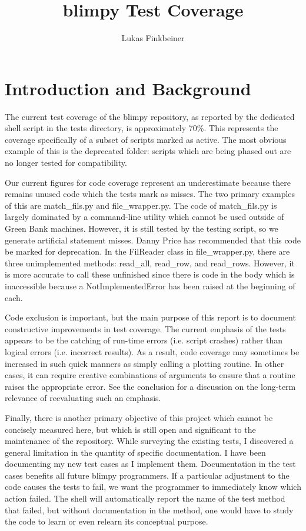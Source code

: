 \documentclass[12pt]{article}
\title{blimpy Test Coverage}
\author{Lukas Finkbeiner}
\begin{document}
\maketitle

\section{Introduction and Background}

\quad \quad The current test coverage of the blimpy repository, as reported by the dedicated shell script in the tests directory, is approximately 70\%. This represents the coverage specifically of a subset of scripts marked as active. The most obvious example of this is the deprecated folder: scripts which are being phased out are no longer tested for compatibility. 

Our current figures for code coverage represent an underestimate because there remains unused code which the tests mark as misses. The two primary examples of this are match\_fils.py and file\_wrapper.py. The code of match\_fils.py is largely dominated by a command-line utility which cannot be used outside of Green Bank machines. However, it is still tested by the testing script, so we generate artificial statement misses. Danny Price has recommended that this code be marked for deprecation. In the FilReader class in file\_wrapper.py, there are three unimplemented methods: read\_all, read\_row, and read\_rows. However, it is more accurate to call these unfinished since there is code in the body which is inaccessible because a NotImplementedError has been raised at the beginning of each.

Code exclusion is important, but the main purpose of this report is to document constructive improvements in test coverage. The current emphasis of the tests appears to be the catching of run-time errors (i.e. script crashes) rather than logical errors (i.e. incorrect results). As a result, code coverage may sometimes be increased in such quick manners as simply calling a plotting routine. In other cases, it can require creative combinations of arguments to ensure that a routine raises the appropriate error. See the conclusion for a discussion on the long-term relevance of reevaluating such an emphasis.

Finally, there is another primary objective of this project which cannot be concisely measured here, but which is still open and significant to the maintenance of the repository. While surveying the existing tests, I discovered a general limitation in the quantity of specific documentation. I have been documenting my new test cases as I implement them. Documentation in the test cases benefits all future blimpy programmers. If a particular adjustment to the code causes the tests to fail, we want the programmer to immediately know which action failed. The shell will automatically report the name of the test method that failed, but without documentation in the method, one would have to study the code to learn or even relearn its conceptual purpose.
\end{document}
